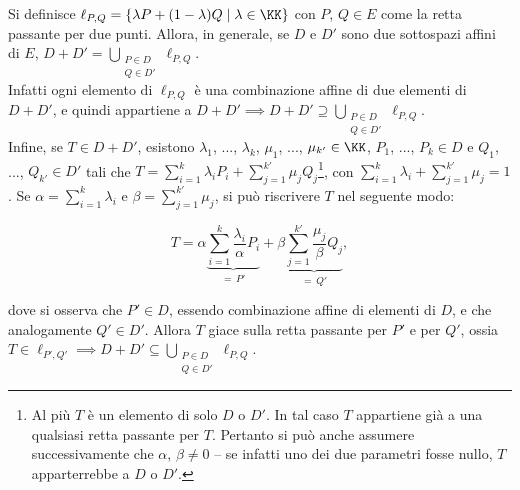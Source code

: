 \documentclass[11pt]{article}
\begin{document}
	\begin{remark}
		Si definisce $\ell_{P,Q} = \{ \lambda P + (1-\lambda) Q \mid \lambda \in \KK \}$ con $P$, $Q \in E$ come la retta passante per due
		punti. Allora, in generale, se $D$ e $D'$ sono due sottospazi
		affini di $E$, $D + D' = \bigcup_{\substack{P \in D \\ Q \in D'}} \ell_{P,Q}$. \\
		
		Infatti ogni elemento di $\ell_{P, Q}$ è una combinazione affine
		di due elementi di $D + D'$, e quindi appartiene a $D + D' \implies
		D + D' \supseteq \bigcup_{\substack{P \in D \\ Q \in D'}} \ell_{P,Q}$. \\
		
		Infine, se $T \in D + D'$, esistono $\lambda_1$, ..., $\lambda_k$,
		$\mu_1$, ..., $\mu_{k'} \in \KK$, $P_1$, ..., $P_k \in D$ e
		$Q_1$, ..., $Q_{k'} \in D'$ tali che $T = \sum_{i=1}^k \lambda_i P_i +
		\sum_{j=1}^{k'} \mu_j Q_j$\footnote{Al più $T$ è un elemento di solo $D$ o $D'$. In tal caso $T$ appartiene già a una qualsiasi retta passante per $T$. Pertanto si può anche assumere successivamente
		che $\alpha$, $\beta \neq 0$ -- se infatti uno dei due parametri
		fosse nullo, $T$ apparterrebbe a $D$ o $D'$.}, con $\sum_{i=1}^k \lambda_i + \sum_{j=1}^{k'} \mu_j = 1$. Se $\alpha = \sum_{i=1}^k \lambda_i$ e
		$\beta = \sum_{j=1}^{k'} \mu_j$, si può riscrivere $T$ nel
		seguente modo:
		
		\[ T = \alpha \underbrace{\sum_{i=1}^k \frac{\lambda_i}{\alpha} P_i}_{=\, P'} +
		\beta \underbrace{\sum_{j=1}^{k'} \frac{\mu_j}{\beta} Q_j}_{=\, Q'}, \]
		
		\vskip 0.05in
		
		dove si osserva che $P' \in D$, essendo combinazione affine di
		elementi di $D$, e che analogamente $Q' \in D'$. Allora
		$T$ giace sulla retta passante per $P'$ e per $Q'$, ossia
		$T \in \ell_{P',Q'} \implies D + D' \subseteq \bigcup_{\substack{P \in D \\ Q \in D'}} \ell_{P,Q}$.
	\end{remark}
\end{document}
